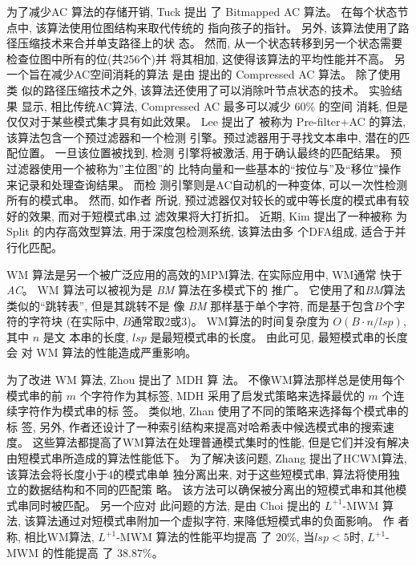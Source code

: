 为了减少\textsf{AC} 算法的存储开销, Tuck \cite{Tuck2004} 提出
了 Bitmapped AC 算法。 在每个状态节点中, 该算法使用位图结构来取代传统的
指向孩子的指针。 另外, 该算法使用了路径压缩技术来合并单支路径上的状
态。 然而, 从一个状态转移到另一个状态需要检查位图中所有的位(共256个)并
将其相加, 这使得该算法的平均性能并不高。 另一个旨在减少AC空间消耗的算法
是由 \cite{Bremler2011} 提出的 \textsf{Compressed AC} 算法。 除了使用类
似的路径压缩技术之外, 该算法还使用了可以消除叶节点状态的技术。 实验结果
显示, 相比传统AC算法, \textsf{Compressed AC} 最多可以减少 $60\%$ 的空间
消耗, 但是仅仅对于某些模式集才具有如此效果。 Lee \cite{Lee2013} 提出了
被称为 \textsf{Pre-filter+AC} 的算法, 该算法包含一个预过滤器和一个检测
引擎。预过滤器用于寻找文本串中, 潜在的匹配位置。 一旦该位置被找到, 检测
引擎将被激活, 用于确认最终的匹配结果。 预过滤器使用一个被称为''主位图''的
比特向量和一些基本的“按位与”及“移位”操作来记录和处理查询结果。 而检
测引擎则是AC自动机的一种变体, 可以一次性检测所有的模式串。 然而, 如作者
所说, 预过滤器仅对较长的或中等长度的模式串有较好的效果, 而对于短模式串,过
滤效果将大打折扣。 近期, Kim \cite{Kim2015} 提出了一种被称
为 \textsf{Split} 的内存高效型算法, 用于深度包检测系统, 该算法由多
个DFA组成, 适合于并行化匹配。

\textsf{WM} 算法是另一个被广泛应用的高效的MPM算法, 在实际应用中, WM通常
快于\emph{AC}。 \textsf{WM} 算法可以被视为是 \emph{BM} 算法在多模式下的
推广。 它使用了和\emph{BM}算法类似的“跳转表”, 但是其跳转不是
像 \emph{BM} 那样基于单个字符, 而是基于包含$B$个字符的字符块 (在实际中,
$B$通常取2或3)。 WM算法的时间复杂度为 $O(B \cdot n/lsp)$, 其中 $n$ 是文
本串的长度, $lsp$ 是最短模式串的长度。 由此可见, 最短模式串的长度会
对 WM 算法的性能造成严重影响。

为了改进 \textsf{WM} 算法, Zhou \cite{Zhou2007} 提出了 \textsf{MDH} 算
法。 不像WM算法那样总是使用每个模式串的前 $m$ 个字符作为其标签,
\textsf{MDH} 采用了启发式策略来选择最优的 $m$ 个连续字符作为模式串的标
签。 类似地, Zhan \cite{Zhan2014} 使用了不同的策略来选择每个模式串的标
签, 另外, 作者还设计了一种索引结构来提高对哈希表中候选模式串的搜索速
度。 这些算法都提高了WM算法在处理普通模式集时的性能, 但是它们并没有解决
由短模式串所造成的算法性能低下。 为了解决该问题, Zhang
\cite{Zhang2009a}提出了\textsf{HCWM}算法, 该算法会将长度小于4的模式串单
独分离出来, 对于这些短模式串, 算法将使用独立的数据结构和不同的匹配策
略。 该方法可以确保被分离出的短模式串和其他模式串同时被匹配。 另一个应对
此问题的方法, 是由 Choi \cite{Choi2011} 提出的 \textsf{$L^{+1}$-MWM} 算
法, 该算法通过对短模式串附加一个虚拟字符, 来降低短模式串的负面影响。 作
者称, 相比WM算法, \textsf{$L^{+1}$-MWM} 算法的性能平均提高
了 $20\%$, 当$lsp < 5$时, \textsf{$L^{+1}$-MWM} 的性能提高
了 $38.87\%$。


